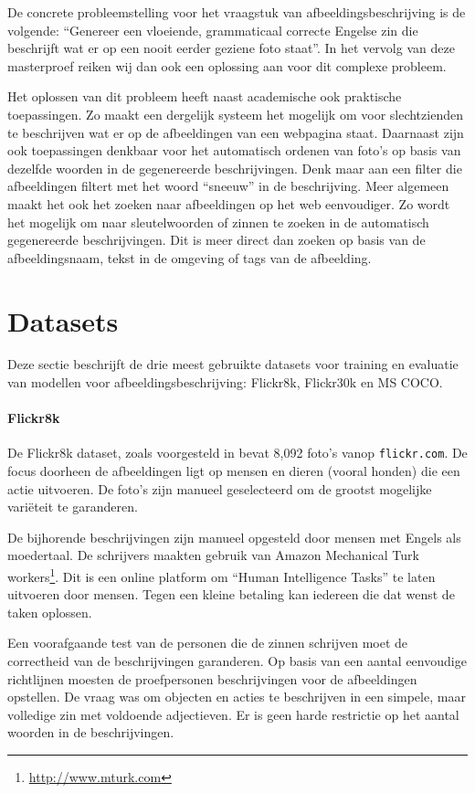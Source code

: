 De concrete probleemstelling voor het vraagstuk van afbeeldingsbeschrijving is de volgende: ``Genereer een vloeiende, grammaticaal correcte Engelse zin die beschrijft wat er op een nooit eerder geziene foto staat''. In het vervolg van deze masterproef reiken wij dan ook een oplossing aan voor dit complexe probleem.

Het oplossen van dit probleem heeft naast academische ook praktische toepassingen. Zo maakt een dergelijk systeem het mogelijk om voor slechtzienden te beschrijven wat er op de afbeeldingen van een webpagina staat. Daarnaast zijn ook toepassingen denkbaar voor het automatisch ordenen van foto's op basis van dezelfde woorden in de gegenereerde beschrijvingen. Denk maar aan een filter die afbeeldingen filtert met het woord ``sneeuw'' in de beschrijving. Meer algemeen maakt het ook het zoeken naar afbeeldingen op het web eenvoudiger. Zo wordt het mogelijk om naar sleutelwoorden of zinnen te zoeken in de automatisch gegenereerde beschrijvingen. Dit is meer direct dan zoeken op basis van de afbeeldingsnaam, tekst in de omgeving of tags van de afbeelding.

\section{Datasets}
\label{sec:Datasets}
Deze sectie beschrijft de drie meest gebruikte datasets voor training en evaluatie van modellen voor afbeeldingsbeschrijving: Flickr8k, Flickr30k en MS COCO.

\paragraph{Flickr8k}
\label{par:Flickr8k}
De Flickr8k dataset, zoals voorgesteld in \cite{Hodosh2013} bevat 8,092 foto's vanop \texttt{flickr.com}. De focus doorheen de afbeeldingen ligt op mensen en dieren (vooral honden) die een actie uitvoeren. De foto's zijn manueel geselecteerd om de grootst mogelijke vari\"eteit te garanderen.

De bijhorende beschrijvingen zijn manueel opgesteld door mensen met Engels als moedertaal. De schrijvers maakten gebruik van Amazon Mechanical Turk workers\footnote{\url{http://www.mturk.com}}. Dit is een online platform om ``Human Intelligence Tasks'' te laten uitvoeren door mensen. Tegen een kleine betaling kan iedereen die dat wenst de taken oplossen. 

Een voorafgaande test van de personen die de zinnen schrijven moet de correctheid van de beschrijvingen garanderen. Op basis van een aantal eenvoudige richtlijnen moesten de proefpersonen beschrijvingen voor de afbeeldingen opstellen. De vraag was om objecten en acties te beschrijven in een simpele, maar volledige zin met voldoende adjectieven. Er is geen harde restrictie op het aantal woorden in de beschrijvingen.\cite{Hockenmaier2014}

